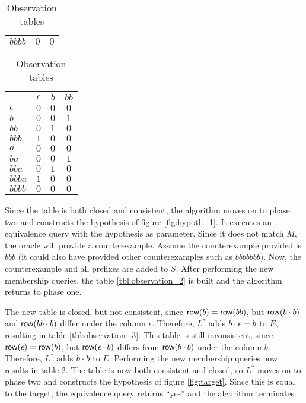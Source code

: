 \begin{table}
\begin{subtable}[h]{.23\textwidth}
\begin{tabular}{ | l || c | c | }
$bbbb$     & $0$        & $0$ \\
\hline
\end{tabular}
\caption{} \label{tbl:observation_3}
\end{subtable}
%
%
\hfill
\begin{subtable}[h]{.23\textwidth}
\centering
\begin{tabular}{ | l || c | c | c | }
\hline
           & $\epsilon$ & $b$   & $bb$ \\ \hline \hline
$\epsilon$ & $0$        & $0$   & $0$  \\
$b$        & $0$        & $0$   & $1$  \\
$bb$       & $0$        & $1$   & $0$  \\
$bbb$      & $1$        & $0$   & $0$  \\ \hline \hline
$a$        & $0$        & $0$   & $0$  \\
$ba$       & $0$        & $0$   & $1$  \\
$bba$      & $0$        & $1$   & $0$  \\
$bbba$     & $1$        & $0$   & $0$  \\
$bbbb$     & $0$        & $0$   & $0$  \\
\hline
\end{tabular}
\caption{} \label{tbl:observation_4}
\end{subtable}
\caption{Observation tables}
\end{table}

Since the table is both closed and consistent, the algorithm moves on to phase two
and constructs the hypothesis of figure \ref{fig:hypoth_1}. It executes an
equivalence query with the hypothesis as parameter. Since it does not match $M$,
the oracle will provide a counterexample. Assume the counterexample provided is
$bbb$ (it could also have provided other counterexamples such as $bbbbbbb$).
Now, the counterexample and all prefixes are added to $S$. After performing the
new membership queries, the table \ref{tbl:observation_2} is built and the
algorithm returns to phase one.

The new table is closed, but not consistent, since $\mathsf{row}(b) = \mathsf{row}(bb)$, but
$\mathsf{row}(b \cdot b)$ and $\mathsf{row}(bb \cdot b)$ differ under the column $\epsilon$.
Therefore, $L^*$ adds $b \cdot \epsilon = b$ to $E$, resulting in table
\ref{tbl:observation_3}. This table is still inconsistent, since $\mathsf{row}(\epsilon)
= \mathsf{row}(b)$, but $\mathsf{row}(\epsilon \cdot b)$ differs from $\mathsf{row}(b \cdot b)$ under
the column $b$. Therefore, $L^*$ adds $b \cdot b$ to $E$. Performing the new
membership queries now results in table \ref{tbl:observation_4}. The table is
now both consistent and closed, so $L^*$ moves on to phase two and constructs the
hypothesis of figure \ref{fig:target}. Since this is equal to the target, the
equivalence query returns ``yes'' and the algorithm terminates.

